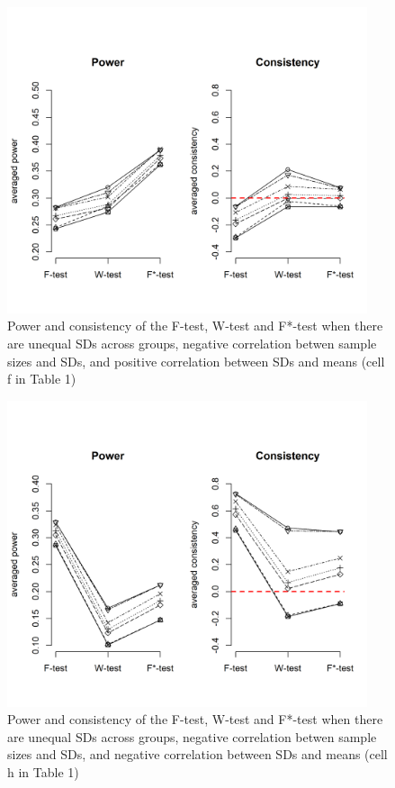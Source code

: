 \documentclass[man,floatsintext]{apa6}
\begin{document}
\begin{figure}
\includegraphics[width=400px]{Rmarkdown folder/Rmarkdown inputs/Fig2f} \caption{Power and consistency of the F-test, W-test and F*-test when there are unequal SDs across groups, negative correlation betwen sample sizes and SDs, and positive correlation between SDs and means (cell f in Table 1)}\label{fig:unnamed-chunk-12}
\end{figure}

\begin{figure}
\includegraphics[width=400px]{Rmarkdown folder/Rmarkdown inputs/Fig2g} \caption{Power and consistency of the F-test, W-test and F*-test when there are unequal SDs across groups, negative correlation betwen sample sizes and SDs, and negative correlation between SDs and means (cell h in Table 1)}\label{fig:unnamed-chunk-13}
\end{figure}
\end{document}
